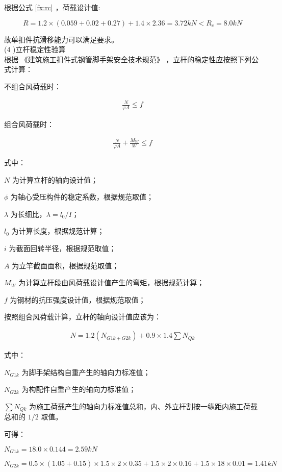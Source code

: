 根据公式 \ref{fx:rc} ，荷载设计值:

$$R=1.2×(0.059+0.02+0.27)+1.4×2.36=3.72kN<R_c=8.0kN$$

故单扣件抗滑移能力可以满足要求。\\

(4 )立杆稳定性验算\\

根据 《建筑施工扣件式钢管脚手架安全技术规范》 ，立杆的稳定性应按照下列公式计算：

不组合风荷载时：

\begin{align}
    \label{fx:nw}
    \frac{N}{\varphi A}\leq f
\end{align}

组合风荷载时：

\begin{align}
    \label{fx:w}
    \frac{N}{\varphi A}+ \frac{M_W}{W}\leq f
\end{align}

式中：

$N$ 为计算立杆的轴向设计值；

$\phi$ 为轴心受压构件的稳定系数，根据规范取值；

$\lambda$ 为长细比，$\lambda =l_0/I$；

$l_0$ 为计算长度，根据规范计算；

$i$ 为截面回转半径，根据规范取值；

$A$ 为立竿截面面积，根据规范取值；

$M_W$ 为计算立杆段由风荷载设计值产生的弯矩，根据规范计算；

$f$ 为钢材的抗压强度设计值，根据规范取值；

按照组合风荷载计算，立杆的轴向设计值应该为：

\begin{align}
    \label{fx:Nzhou}
    N=1.2(N_{G1k+G2k})+0.9\times 1.4\sum N_{Qk}
\end{align}

式中：

$N_{G1k}$ 为脚手架结构自重产生的轴向力标准值； 

$N_{G2k}$ 为构配件自重产生的轴向力标准值；

$\sum N_{Qk}$ 为施工荷载产生的轴向力标准值总和，内、外立杆割按一纵距内施工荷载
总和的 $1/2$ 取值。

可得：

$N_{G1k}=18.0\times 0.144=2.59 kN$

$N_{G2k}=0.5\times (1.05+0.15)\times 1.5\times 2\times 0.35+1.5\times 2\times 0.16+1.5\times 18\times 0.01=1.41 kN$

